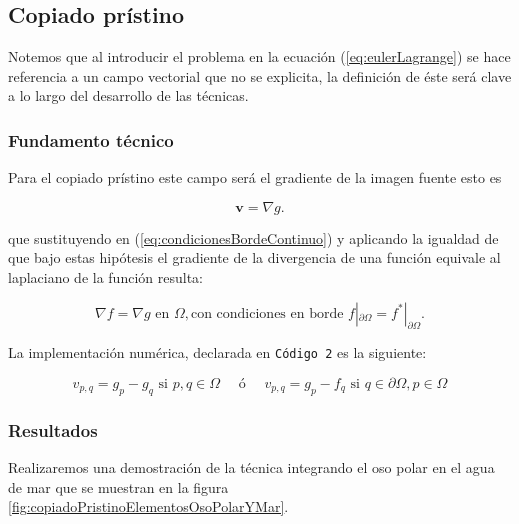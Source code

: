 \documentclass[11pt,twoside,titlepage,a4paper]{article}
\numberwithin{equation}{section} %
\theoremstyle{usual}
\begin{document}
\subsection{Copiado prístino}\label{tecnica:copiadoPristino}

Notemos que al introducir el problema en la ecuación  (\ref{eq:eulerLagrange}) se hace referencia a un campo vectorial que no se explicita, la definición de éste será clave a lo largo del desarrollo de las técnicas.   

\subsubsection{Fundamento técnico}
Para el copiado prístino este campo será el gradiente de la imagen fuente esto es 

\begin{equation}
    \textbf{v} = \nabla g.
\end{equation}

que sustituyendo en (\ref{eq:condicionesBordeContinuo}) y aplicando la igualdad de que bajo estas hipótesis el gradiente de la divergencia de una función equivale al laplaciano de la función resulta:  

\begin{equation}
    \nabla f = \nabla g \text{ en } \Omega, \text{con condiciones en borde } f|_{\partial \Omega} = f^* | _{\partial \Omega}.
\end{equation}  

La implementación numérica, declarada en \texttt{Código 2} es la siguiente: 

\begin{equation}
   v_{p,q} = g_p - g_q  \text { si } p,q \in \Omega \quad \text{  ó   }\quad v_{p,q} = g_p - f_q \text{ si } q \in \partial \Omega,  p \in \Omega  
\end{equation}

\subsubsection{Resultados} 
Realizaremos una demostración de la técnica integrando el oso polar en el agua de mar que se muestran en la figura \ref{fig:copiadoPristinoElementosOsoPolarYMar}.   
\end{document}
